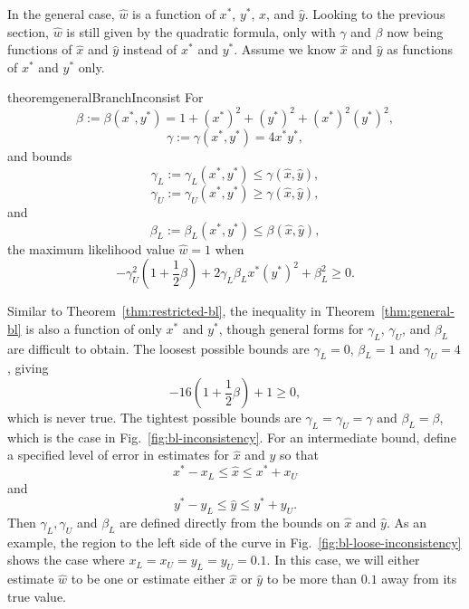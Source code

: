 \documentclass{article}
\begin{document}
In the general case, $\hat{w}$ is a function of $x^*$, $y^*$, $\hat{x}$, and $\hat{y}$.
Looking to the previous section, $\hat{w}$ is still given by the quadratic formula, only with $\gamma$ and $\beta$ now being functions of $\hat{x}$ and $\hat{y}$ instead of $x^*$ and $y^*$.
Assume we know $\hat{x}$ and $\hat{y}$ as functions of $x^*$ and $y^*$ only.
\begin{restatable}{theorem}{generalBranchInconsist}
\label{thm:general-bl}
For
$$
\beta := \beta(x^*, y^*) = 1+(x^*)^2+(y^*)^2+(x^*)^2(y^*)^2,
$$
$$
\gamma := \gamma(x^*, y^*) = 4x^*y^*,
$$
and bounds
$$
\gamma_L := \gamma_{L}(x^*, y^*) \le \gamma(\hat{x}, \hat{y}),
$$
$$
\gamma_U := \gamma_{U}(x^*, y^*) \ge \gamma(\hat{x}, \hat{y}),
$$
and
$$
\beta_L := \beta_{L}(x^*, y^*) \le \beta(\hat{x}, \hat{y}),
$$
the maximum likelihood value $\hat{w}=1$ when
$$
-\gamma_{U}^2\left(1 + \frac{1}{2}\beta\right) + 2\gamma_{L}\beta_{L}x^*(y^*)^2 + \beta_{L}^2 \ge 0.
$$
\end{restatable}
Similar to Theorem~\ref{thm:restricted-bl}, the inequality in Theorem~\ref{thm:general-bl} is also a function of only $x^*$ and $y^*$, though general forms for $\gamma_L$, $\gamma_U$, and $\beta_L$ are difficult to obtain.
The loosest possible bounds are $\gamma_{L} = 0$, $\beta_{L} = 1$ and $\gamma_{U} = 4$, giving
$$
-16\left(1 + \frac{1}{2}\beta\right) + 1 \ge 0,
$$
which is never true.
The tightest possible bounds are $\gamma_{L} = \gamma_{U} = \gamma$ and $\beta_{L} = \beta$, which is the case in Fig.~\ref{fig:bl-inconsistency}.
For an intermediate bound, define a specified level of error in estimates for $\hat{x}$ and $\hat{y}$ so that
$$
x^*-x_{L} \le \hat{x} \le x^*+x_{U}
$$
and
$$
y^*-y_{L} \le \hat{y} \le y^*+y_{U}.
$$
Then $\gamma_L, \gamma_U$ and $\beta_L$ are defined directly from the bounds on $\hat{x}$ and $\hat{y}$.
As an example, the region to the left side of the curve in Fig.~\ref{fig:bl-loose-inconsistency} shows the case where $x_L=x_U=y_L=y_U=0.1$.
In this case, we will either estimate $\hat{w}$ to be one or estimate either $\hat{x}$ or $\hat{y}$ to be more than $0.1$ away from its true value.
\end{document}
